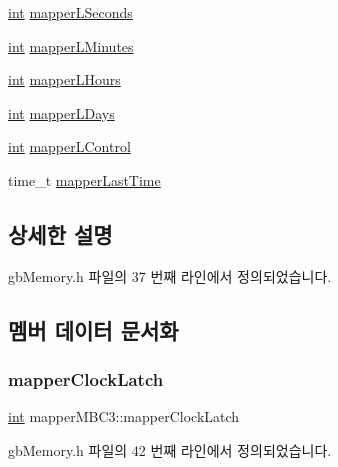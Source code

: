 \begin{DoxyCompactItemize}
\mbox{\hyperlink{_util_8cpp_a0ef32aa8672df19503a49fab2d0c8071}{int}} \mbox{\hyperlink{structmapper_m_b_c3_a5c7710784dadb3e7060dbb0b9142b704}{mapper\+L\+Seconds}}
\item 
\mbox{\hyperlink{_util_8cpp_a0ef32aa8672df19503a49fab2d0c8071}{int}} \mbox{\hyperlink{structmapper_m_b_c3_adb3ee748b8ab95c0a0838149852d38f7}{mapper\+L\+Minutes}}
\item 
\mbox{\hyperlink{_util_8cpp_a0ef32aa8672df19503a49fab2d0c8071}{int}} \mbox{\hyperlink{structmapper_m_b_c3_a57baf0090734e5934fcc90b2a4ed371e}{mapper\+L\+Hours}}
\item 
\mbox{\hyperlink{_util_8cpp_a0ef32aa8672df19503a49fab2d0c8071}{int}} \mbox{\hyperlink{structmapper_m_b_c3_a064bb5d4f64ac74e8ce84a19f4ceceeb}{mapper\+L\+Days}}
\item 
\mbox{\hyperlink{_util_8cpp_a0ef32aa8672df19503a49fab2d0c8071}{int}} \mbox{\hyperlink{structmapper_m_b_c3_aaa650a87f08367af631a599d2ff39655}{mapper\+L\+Control}}
\item 
time\+\_\+t \mbox{\hyperlink{structmapper_m_b_c3_a0af0b1504e0506e54dafd63f19bfedf5}{mapper\+Last\+Time}}
\end{DoxyCompactItemize}


\subsection{상세한 설명}


gb\+Memory.\+h 파일의 37 번째 라인에서 정의되었습니다.



\subsection{멤버 데이터 문서화}
\mbox{\label{structmapper_m_b_c3_a7c4d4b0f79f1e91660e0acbe5c1f541d}} 
\subsubsection{\texorpdfstring{mapper\+Clock\+Latch}{mapperClockLatch}}
{\footnotesize\ttfamily \mbox{\hyperlink{_util_8cpp_a0ef32aa8672df19503a49fab2d0c8071}{int}} mapper\+M\+B\+C3\+::mapper\+Clock\+Latch}



gb\+Memory.\+h 파일의 42 번째 라인에서 정의되었습니다.


